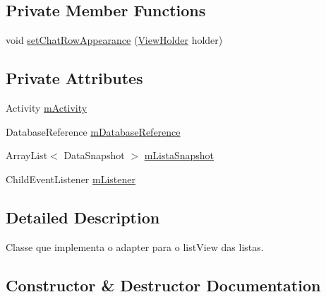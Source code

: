 \subsection*{Private Member Functions}
\begin{DoxyCompactItemize}
\item 
void \mbox{\hyperlink{classbr_1_1unb_1_1cic_1_1mp_1_1marketmaster_1_1ListasAdapter_a0bd71a4df35d3e69f2394b6f3186d35a}{set\+Chat\+Row\+Appearance}} (\mbox{\hyperlink{classbr_1_1unb_1_1cic_1_1mp_1_1marketmaster_1_1ListasAdapter_1_1ViewHolder}{View\+Holder}} holder)
\end{DoxyCompactItemize}
\subsection*{Private Attributes}
\begin{DoxyCompactItemize}
\item 
Activity \mbox{\hyperlink{classbr_1_1unb_1_1cic_1_1mp_1_1marketmaster_1_1ListasAdapter_a637de3aa28d6d09beafebf263b61dec4}{m\+Activity}}
\item 
Database\+Reference \mbox{\hyperlink{classbr_1_1unb_1_1cic_1_1mp_1_1marketmaster_1_1ListasAdapter_a9655329da54a9d8f14ebe695b08ff09f}{m\+Database\+Reference}}
\item 
Array\+List$<$ Data\+Snapshot $>$ \mbox{\hyperlink{classbr_1_1unb_1_1cic_1_1mp_1_1marketmaster_1_1ListasAdapter_adac21a98404a640aad7af15441697c3e}{m\+Lista\+Snapshot}}
\item 
Child\+Event\+Listener \mbox{\hyperlink{classbr_1_1unb_1_1cic_1_1mp_1_1marketmaster_1_1ListasAdapter_abec4477f7b5f6e1f1dac969362b141b8}{m\+Listener}}
\end{DoxyCompactItemize}


\subsection{Detailed Description}
Classe que implementa o adapter para o list\+View das listas. 

\subsection{Constructor \& Destructor Documentation}
\mbox{\label{classbr_1_1unb_1_1cic_1_1mp_1_1marketmaster_1_1ListasAdapter_aefea99ae267922406c46fea440d4686c}} 
